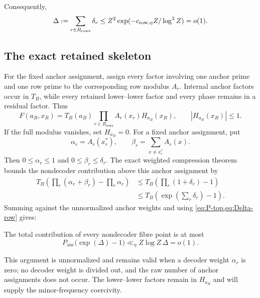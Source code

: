 Consequently,
\begin{equation}
\label{eq:Delta-row}
 \Delta:=\sum_{r\in R_{\mathrm{rows}}}\delta_r
 \leq Z^2\exp(-c_{\rm row,\eta}Z/\log^3Z)=o(1).
\end{equation}

\subsection{The exact retained skeleton}

For the fixed anchor assignment, assign every factor involving one anchor prime and one row prime to the corresponding row modulus $A_r$.  Internal anchor factors occur in $T_B$, while every retained lower--lower factor and every phase remains in a residual factor.  Thus
\begin{equation}
\label{eq:concrete-fibre-factorization}
 F(a_B,x_R)
 =T_B(a_B)\prod_{r\in R_{\mathrm{rows}}}A_r(x_r)
  H_{a_B}(x_R),
 \qquad |H_{a_B}(x_R)|\leq1.
\end{equation}
If the full modulus vanishes, set $H_{a_B}=0$.  For a fixed anchor assignment, put
\[
 \alpha_r=A_r(x_r^*),
 \qquad
 \beta_r=\sum_{x\neq x_r^*}A_r(x).
\]
Then $0\leq\alpha_r\leq1$ and $0\leq\beta_r\leq\delta_r$.  The exact weighted compression theorem bounds the nondecoder contribution above this anchor assignment by
\begin{align*}
 T_B\left(\prod_r(\alpha_r+\beta_r)-\prod_r\alpha_r\right)
 &\leq T_B\left(\prod_r(1+\delta_r)-1\right)\\
 &\leq T_B\left(\exp\left(\sum_r\delta_r\right)-1\right).
\end{align*}
Summing against the unnormalized anchor weights and using \cref{eq:P-top,eq:Delta-row} gives:

\begin{proposition}
\label{prop:global-fibre-error}
The total contribution of every nondecoder fibre point is at most
\begin{equation}
\label{eq:global-fibre-error}
 P_{\mathrm{anc}}\bigl(\exp(\Delta)-1\bigr)
 \ll_\eta Z\log Z\,\Delta=o(1).
\end{equation}
\end{proposition}

This argument is unnormalized and remains valid when a decoder weight $\alpha_r$ is zero; no decoder weight is divided out, and the raw number of anchor assignments does not occur.  The lower--lower factors remain in $H_{a_B}$ and will supply the minor-frequency coercivity.

